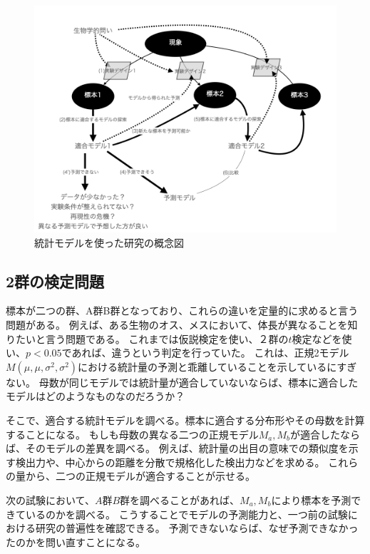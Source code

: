 \begin{figure}
    \begin{center}
        \includegraphics[width=15cm]{./image/01_/conceptual_diagram/conceptual_diagram.006.png}
        \caption{統計モデルを使った研究の概念図}
        \label{fig:conceptual_diagram_statistics_research}
    \end{center}
\end{figure}


\subsection{2群の検定問題}
標本が二つの群、A群B群となっており、これらの違いを定量的に求めると言う問題がある。
例えば、ある生物のオス、メスにおいて、体長が異なることを知りたいと言う問題である。
これまでは仮説検定を使い、２群の$t$検定などを使い、$p<0.05$であれば、違うという判定を行っていた。
これは、正規2モデル$M(\mu,\mu,\sigma^2,\sigma^2)$における統計量の予測と乖離していることを示しているにすぎない。
母数が同じモデルでは統計量が適合していないならば、標本に適合したモデルはどのようなものなのだろうか？

そこで、適合する統計モデルを調べる。標本に適合する分布形やその母数を計算することになる。
もしも母数の異なる二つの正規モデル$M_a,M_b$が適合したならば、そのモデルの差異を調べる。
例えば、統計量の出目の意味での類似度を示す検出力や、中心からの距離を分散で規格化した検出力などを求める。
これらの量から、二つの正規モデルが適合することが示せる。

次の試験において、$A$群$B$群を調べることがあれば、$M_a,M_b$により標本を予測できているのかを調べる。
こうすることでモデルの予測能力と、一つ前の試験における研究の普遍性を確認できる。
予測できないならば、なぜ予測できなかったのかを問い直すことになる。


